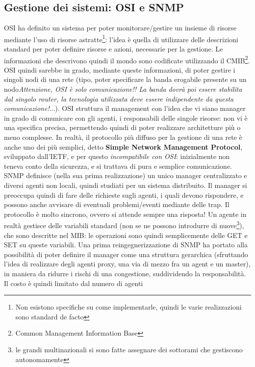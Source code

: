 \subsection{Gestione dei sistemi: OSI e SNMP}
OSI ha definito un sistema per poter monitorare/gestire un insieme di risorse mediante l'uso di risorse
astratte\footnote{Non esistono specifiche su come implementarle, quindi le varie realizzazioni sono standard de facto}:
l'idea è quella di utilizzare delle descrizioni standard per poter definire risorse e azioni, necessarie per la
gestione. Le informazioni che descrivono quindi il mondo sono codificate utilizzando il CMIB\footnote{Common Management
Information Base}. OSI quindi sarebbe in grado, mediante queste informazioni, di poter gestire i singoli nodi di una
rete (tipo, poter specificare la banda erogabile presente su un nodo\textit{Attenzione, OSI è solo comunicazione!! La
banda dovrà poi essere stabilita dal singolo router, la tecnologia utilizzata deve essere indipendente da questa
comunicazione!}...).
OSI struttura il management con l'idea che vi siano manager in grado di comunicare con gli agenti, i responsabili
delle singole risorse: non vi è una specifica precisa, permettendo quindi di poter realizzare architetture più o meno
complesse.
In realtà, il protocollo più diffuso per la gestione di una rete è anche uno dei più semplici, detto \textbf{Simple
Network Management Protocol}, sviluppato dall'IETF, e per questo \textit{incompatibile con OSI}: inizialmente non
teneva conto della sicurezza, e si trattava di pura e semplice comunicazione.
SNMP definisce (nella sua prima realizzazione) un unico manager centralizzato e diversi agenti non locali, quindi
studiati per un sistema distribuito. Il manager si preoccupa quindi di fare delle richieste sugli agenti, i quali
devono rispondere, e possono anche avvisare di eventuali problemi/eventi mediante delle trap. Il protocollo è molto
sincrono, ovvero si attende sempre una risposta!
Un agente in realtà gestisce delle variabili standard (non se ne possono introdurre di nuove\footnote{le grandi
multinazionali si sono fatte assegnare dei sottorami che gestiscono autonomamente}), che sono descritte nel MIB: le
operazioni sono quindi semplicemente delle GET e SET su queste variabili.
Una prima reingegnerizzazione di SNMP ha portato alla possibilità di poter definire il manager come una struttura
gerarchica (sfruttando l'idea di realizzare degli agenti proxy, una via di mezzo fra un agent e un master), in maniera
da ridurre i rischi di una congestione, suddividendo la responsabilità. Il costo è quindi limitato dal numero di agenti

